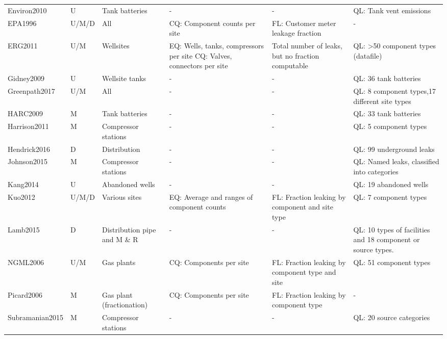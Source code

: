 \documentclass[11pt]{report}
\begin{document}
{{{{\begin{landscape}
\begin{table}[]
\begin{scriptsize}
\begin{tabular*}{1\columnwidth}{p{}p{}p{}p{}p{}p{}}
Environ2010        	& U         			& Tank batteries        	& -      							& - 												& QL: Tank vent emissions      \\
EPA1996 			& U/M/D     		& All					& CQ: Component counts per site        	& FL: Customer meter leakage fraction       				& -       \\
ERG2011     		& U/M       		& Wellsites    			& EQ: Wells, tanks, compressors per site  CQ: Valves, connectors per site & Total number of leaks, but no fraction computable  & QL: >50 component types (datafile)          \\
Gidney2009  		& U         			& Wellsite tanks        		& -     							 & - 												& QL: 36 tank batteries       \\
Greenpath2017         & U/M       		& All					& -      							& - 												& QL: 8 component types,17 different site types  \\
HARC2009    		& M         			& Tank batteries        	& -      							& - 												& QL: 33 tank batteries       \\
Harrison2011		& M         			& Compressor stations    	& -      							& - 												& QL: 5 component types   \\
Hendrick2016		& D         			& Distribution      		& -      						& - 												& QL: 99 underground leaks    \\
Johnson2015 		& M         			& Compressor stations    	& -      							& - 												& QL: Named leaks, classified into categories     \\
Kang2014    		& U         			& Abandoned wells        	& -      							& - 												& QL: 19 abandoned wells      \\
Kuo2012     		& U/M/D     		& Various sites			& EQ: Average and ranges of component counts & FL: Fraction leaking by component and site type     	& QL: 7 component types       \\
Lamb2015    		& D         			& Distribution pipe and M \& R & -      						& - 												& QL: 10 types of facilities and 18 component or source types.        \\
NGML2006    		& U/M       		& Gas plants   			& CQ: Components per site    			& FL: Fraction leaking by component type and site     		& QL: 51 component types      \\
Picard2006  		& M         			& Gas plant (fractionation) & CQ: Components per site     			& FL: Fraction leaking by component type  				& -       \\
Subramanian2015   	& M         			& Compressor stations    	& -      							& - 												& QL: 20 source categories    \\

\end{tabular*}
\end{scriptsize}
\end{table}
\end{landscape}}}}}
\end{document}
